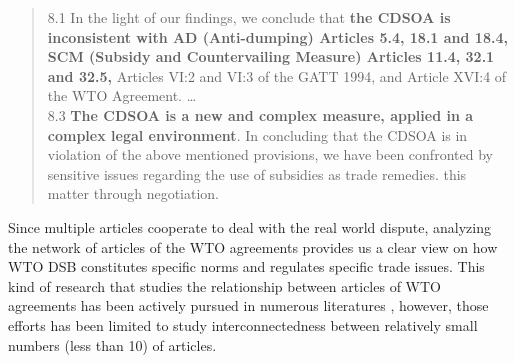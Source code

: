 \blockquote{
  8.1 In the light of our findings, we conclude that \textbf{the CDSOA is inconsistent with AD (Anti-dumping)
  Articles 5.4, 18.1 and 18.4, SCM (Subsidy and Countervailing Measure) Articles 11.4, 32.1 and 32.5,} Articles VI:2 and VI:3 of the GATT
  1994, and Article XVI:4 of the WTO Agreement. \ldots\\
  8.3 \textbf{The CDSOA is a new and complex measure, applied in a complex legal environment}. In
  concluding that the CDSOA is in violation of the above mentioned provisions, we have been
  confronted by sensitive issues regarding the use of subsidies as trade remedies.
  this matter through negotiation.
}

Since multiple articles cooperate to deal with the real world dispute, analyzing the network of articles of the WTO agreements provides us a clear view on how WTO DSB constitutes specific norms and regulates specific trade issues.
This kind of research that studies the relationship between articles of WTO agreements has been actively pursued in numerous literatures \citep{chadXXIII, charnovitz, Trachtman, who_gets}, however, those efforts has been limited to
study interconnectedness between relatively small numbers (less than 10) of articles. %

